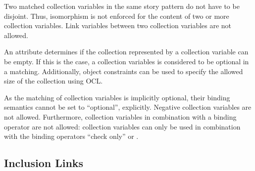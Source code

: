 {Two matched collection variables in the same story pattern do not have to be disjoint.
Thus, isomorphism is not enforced for the content of two or more collection variables.
Link variables between two collection variables are not allowed.

An attribute determines if the collection represented by a collection variable can be empty. 
If this is the case, a collection variables is considered to be optional in a
matching. Additionally, object constraints can be used to specify the allowed size of
the collection using OCL.

As the matching of collection variables is implicitly optional, their binding semantics cannot be set to ``optional'', explicitly.
Negative collection variables are not allowed.
Furthermore, collection variables in combination with a \create binding operator
are not allowed: collection variables can only be used in combination with the
binding operators ``check only'' or \destroy.






}%


\subsection{Inclusion Links}
\label{sec:StoryPatterns:inclusion}

